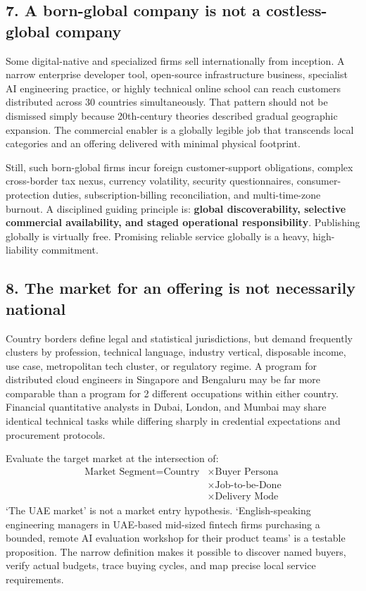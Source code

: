 \subsection{7. A born-global company is not a costless-global company}

Some digital-native and specialized firms sell internationally from inception. A narrow enterprise developer tool, open-source infrastructure business, specialist AI engineering practice, or highly technical online school can reach customers distributed across 30 countries simultaneously. That pattern should not be dismissed simply because 20th-century theories described gradual geographic expansion. The commercial enabler is a globally legible job that transcends local categories and an offering delivered with minimal physical footprint.

Still, such born-global firms incur foreign customer-support obligations, complex cross-border tax nexus, currency volatility, security questionnaires, consumer-protection duties, subscription-billing reconciliation, and multi-time-zone burnout. A disciplined guiding principle is: \textbf{global discoverability, selective commercial availability, and staged operational responsibility}. Publishing globally is virtually free. Promising reliable service globally is a heavy, high-liability commitment.

\subsection{8. The market for an offering is not necessarily national}

Country borders define legal and statistical jurisdictions, but demand frequently clusters by profession, technical language, industry vertical, disposable income, use case, metropolitan tech cluster, or regulatory regime. A program for distributed cloud engineers in Singapore and Bengaluru may be far more comparable than a program for 2 different occupations within either country. Financial quantitative analysts in Dubai, London, and Mumbai may share identical technical tasks while differing sharply in credential expectations and procurement protocols.

Evaluate the target market at the intersection of:
\begin{equation}
\begin{aligned}
\text{Market Segment} = \text{Country} &\times \text{Buyer Persona} \\
&\times \text{Job-to-be-Done} \\
&\times \text{Delivery Mode}
\end{aligned}
\end{equation}
`The UAE market' is not a market entry hypothesis. `English-speaking engineering managers in UAE-based mid-sized fintech firms purchasing a bounded, remote AI evaluation workshop for their product teams' is a testable proposition. The narrow definition makes it possible to discover named buyers, verify actual budgets, trace buying cycles, and map precise local service requirements.

